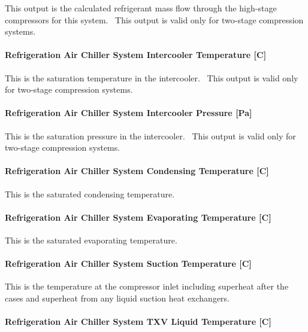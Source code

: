This output is the calculated refrigerant mass flow through the high-stage compressors for this system.~ This output is valid only for two-stage compression systems.

\paragraph{Refrigeration Air Chiller System Intercooler Temperature {[}C{]}}\label{refrigeration-air-chiller-system-intercooler-temperature-c}

This is the saturation temperature in the intercooler.~ This output is valid only for two-stage compression systems.

\paragraph{Refrigeration Air Chiller System Intercooler Pressure {[}Pa{]}}\label{refrigeration-air-chiller-system-intercooler-pressure-pa}

This is the saturation pressure in the intercooler.~ This output is valid only for two-stage compression systems.

\paragraph{Refrigeration Air Chiller System Condensing Temperature {[}C{]}}\label{refrigeration-air-chiller-system-condensing-temperature-c}

This is the saturated condensing temperature.

\paragraph{Refrigeration Air Chiller System Evaporating Temperature {[}C{]}}\label{refrigeration-air-chiller-system-evaporating-temperature-c}

This is the saturated evaporating temperature.

\paragraph{Refrigeration Air Chiller System Suction Temperature {[}C{]}}\label{refrigeration-air-chiller-system-suction-temperature-c}

This is the temperature at the compressor inlet including superheat after the cases and superheat from any liquid suction heat exchangers.

\paragraph{Refrigeration Air Chiller System TXV Liquid Temperature {[}C{]}}\label{refrigeration-air-chiller-system-txv-liquid-temperature-c}

